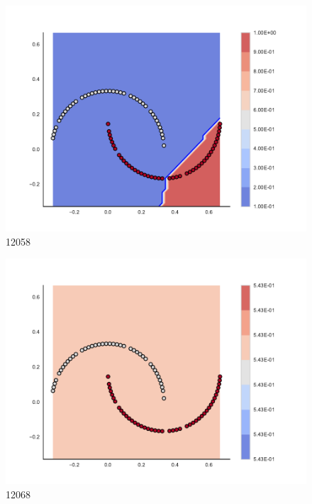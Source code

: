 \begin{subfigure}[b]{0.09\textwidth}
    \includegraphics[clip, trim=2.35cm 1.75cm 4.5cm 0cm,width=\textwidth]{img/convergence/12058.pdf}
    \caption{12058}
    \label{fig:convergence_12058}
\end{subfigure}
%
\begin{subfigure}[b]{0.09\textwidth}
    \includegraphics[clip, trim=2.35cm 1.75cm 4.5cm 0cm,width=\textwidth]{img/convergence/12068.pdf}
    \caption{12068}
    \label{fig:convergence_12068}
\end{subfigure}
%
